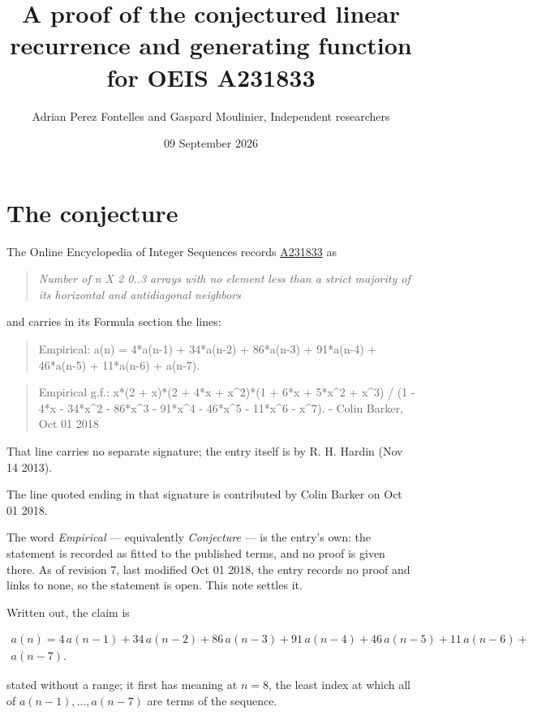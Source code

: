 \documentclass[11pt]{article}
\title{A proof of the conjectured linear recurrence and generating function for OEIS A231833}
\author{Adrian Perez Fontelles and Gaspard Moulinier, Independent researchers}
\date{09 September 2026}
\theoremstyle{definition}
\begin{document}
\maketitle
\section{The conjecture}

The Online Encyclopedia of Integer Sequences records \href{https://oeis.org/A231833}{A231833} as

\begin{quote}\itshape Number of n X 2 0..3 arrays with no element less than a strict majority of its horizontal and antidiagonal neighbors\end{quote}

and carries in its Formula section the lines:

\begin{quote}\ttfamily Empirical: a(n) = 4*a(n-1) + 34*a(n-2) + 86*a(n-3) + 91*a(n-4) + 46*a(n-5) + 11*a(n-6) + a(n-7).\end{quote}

\begin{quote}\ttfamily Empirical g.f.: x*(2 + x)*(2 + 4*x + x\textasciicircum{}2)*(1 + 6*x + 5*x\textasciicircum{}2 + x\textasciicircum{}3) / (1 - 4*x - 34*x\textasciicircum{}2 - 86*x\textasciicircum{}3 - 91*x\textasciicircum{}4 - 46*x\textasciicircum{}5 - 11*x\textasciicircum{}6 - x\textasciicircum{}7). - Colin Barker, Oct 01 2018\end{quote}

That line carries no separate signature; the entry itself is by R. H. Hardin (Nov 14 2013).

The line quoted ending in that signature is contributed by Colin Barker on Oct 01 2018.

The word {\itshape Empirical} --- equivalently {\itshape Conjecture} --- is the entry's own: the statement is recorded as fitted to the published terms, and no proof is given there. As of revision 7, last modified Oct 01 2018, the entry records no proof and links to none, so the statement is open. This note settles it.

Written out, the claim is

\begin{multline*} a(n) = 4\,a(n-1) + 34\,a(n-2) + 86\,a(n-3) + 91\,a(n-4) + 46\,a(n-5) + 11\,a(n-6) + \\ a(n-7). \end{multline*}

stated without a range; it first has meaning at $n = 8$, the least index at which all of $a(n-1),\dots,a(n-7)$ are terms of the sequence.
\end{document}
